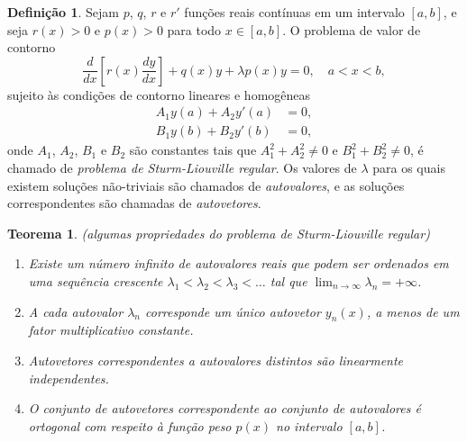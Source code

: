 \documentclass[12pt]{article}
\theoremstyle{plain}
\newtheorem{thm}{Teorema}[section]
\theoremstyle{definition}
\newtheorem{defn}{Definição}[section]
\theoremstyle{remark}
\begin{document}
\begin{defn}
    Sejam \(p\), \(q\), \(r\) e \(r'\) funções reais contínuas em um intervalo \([a,b]\), e seja \(r(x)>0\) e \(p(x)>0\) para todo \(x \in [a,b]\). O problema de valor de contorno
    \begin{equation}
        \frac{d}{dx}\left[r(x)\frac{dy}{dx}\right] + q(x)y + \lambda p(x)y = 0, \quad a < x < b,
    \end{equation}
    \noindent sujeito às condições de contorno lineares e homogêneas
    \begin{align}
        A_1 y(a) + A_2 y'(a) &= 0, \\
        B_1 y(b) + B_2 y'(b) &= 0,
    \end{align}
    \noindent onde \(A_1\), \(A_2\), \(B_1\) e \(B_2\) são constantes tais que \(A_1^2 + A_2^2 \neq 0\) e \(B_1^2 + B_2^2 \neq 0\), é chamado de \emph{problema de Sturm-Liouville regular}. Os valores de \(\lambda\) para os quais existem soluções não-triviais são chamados de \emph{autovalores}, e as soluções correspondentes são chamadas de \emph{autovetores}.
\end{defn}

\begin{thm} (algumas propriedades do problema de Sturm-Liouville regular)
    \begin{enumerate}
        \item[\textup{(a)}] Existe um número infinito de autovalores reais que podem ser ordenados em uma sequência crescente \( \lambda_1 < \lambda_2 < \lambda_3 < \ldots \) tal que \( \lim_{n \to \infty} \lambda_n = +\infty \).
        \item[\textup{(b)}] A cada autovalor \( \lambda_n \) corresponde um único autovetor \( y_n(x) \), a menos de um fator multiplicativo constante.
        \item[\textup{(c)}] Autovetores correspondentes a autovalores distintos são linearmente independentes.
        \item[\textup{(d)}] O conjunto de autovetores correspondente ao conjunto de autovalores é ortogonal com respeito à função peso \( p(x) \) no intervalo \([a,b]\).
    \end{enumerate}
\end{thm}
\end{document}
